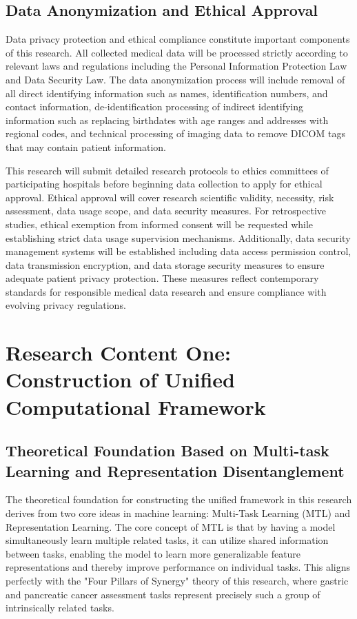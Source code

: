 \subsection{Data Anonymization and Ethical Approval}

Data privacy protection and ethical compliance constitute important components of this research. All collected medical data will be processed strictly according to relevant laws and regulations including the Personal Information Protection Law and Data Security Law. The data anonymization process will include removal of all direct identifying information such as names, identification numbers, and contact information, de-identification processing of indirect identifying information such as replacing birthdates with age ranges and addresses with regional codes, and technical processing of imaging data to remove DICOM tags that may contain patient information.

This research will submit detailed research protocols to ethics committees of participating hospitals before beginning data collection to apply for ethical approval. Ethical approval will cover research scientific validity, necessity, risk assessment, data usage scope, and data security measures. For retrospective studies, ethical exemption from informed consent will be requested while establishing strict data usage supervision mechanisms. Additionally, data security management systems will be established including data access permission control, data transmission encryption, and data storage security measures to ensure adequate patient privacy protection. These measures reflect contemporary standards for responsible medical data research and ensure compliance with evolving privacy regulations.

\section{Research Content One: Construction of Unified Computational Framework}

\subsection{Theoretical Foundation Based on Multi-task Learning and Representation Disentanglement}

The theoretical foundation for constructing the unified framework in this research derives from two core ideas in machine learning: Multi-Task Learning (MTL) and Representation Learning. The core concept of MTL is that by having a model simultaneously learn multiple related tasks, it can utilize shared information between tasks, enabling the model to learn more generalizable feature representations and thereby improve performance on individual tasks. This aligns perfectly with the "Four Pillars of Synergy" theory of this research, where gastric and pancreatic cancer assessment tasks represent precisely such a group of intrinsically related tasks.

